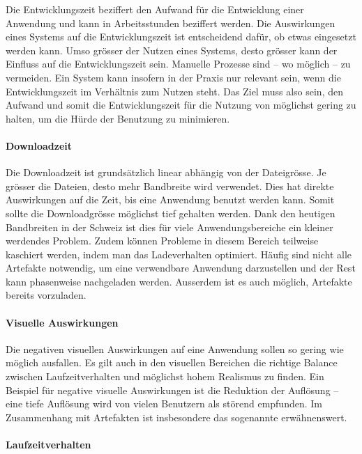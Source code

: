 Die Entwicklungszeit beziffert den Aufwand für die Entwicklung einer Anwendung und kann in Arbeitsstunden beziffert werden.
Die Auswirkungen eines Systems auf die Entwicklungszeit ist entscheidend dafür, ob etwas eingesetzt werden kann. Umso grösser der Nutzen eines Systems, desto grösser kann der Einfluss auf die Entwicklungszeit sein. Manuelle Prozesse sind – wo möglich – zu vermeiden. Ein System kann insofern in der Praxis nur relevant sein, wenn die Entwicklungszeit im Verhältnis zum Nutzen steht. Das Ziel muss also sein, den Aufwand und somit die Entwicklungszeit für die Nutzung von  möglichst gering zu halten, um die Hürde der Benutzung zu minimieren.

\paragraph{Downloadzeit}

Die Downloadzeit ist grundsätzlich linear abhängig von der Dateigrösse.
Je grösser die Dateien, desto mehr Bandbreite wird verwendet. Dies hat direkte Auswirkungen auf die Zeit, bis eine Anwendung benutzt werden kann. Somit sollte die Downloadgrösse möglichst tief gehalten werden.
Dank den heutigen Bandbreiten in der Schweiz ist dies für viele Anwendungsbereiche ein kleiner werdendes Problem.
Zudem können Probleme in diesem Bereich teilweise kaschiert werden, indem man das Ladeverhalten optimiert. Häufig sind nicht alle Artefakte notwendig, um eine verwendbare Anwendung darzustellen und der Rest kann phasenweise nachgeladen werden.
Ausserdem ist es auch möglich, Artefakte bereits vorzuladen.

\paragraph{Visuelle Auswirkungen}

Die negativen visuellen Auswirkungen auf eine Anwendung sollen so gering wie möglich ausfallen. Es gilt auch in den visuellen Bereichen die richtige Balance zwischen Laufzeitverhalten und möglichst hohem Realismus zu finden. Ein Beispiel für negative visuelle Auswirkungen ist die Reduktion der Auflösung – eine tiefe Auflösung wird von vielen Benutzern als störend empfunden. Im Zusammenhang mit  Artefakten ist insbesondere das sogenannte  erwähnenswert.

\paragraph{Laufzeitverhalten}

